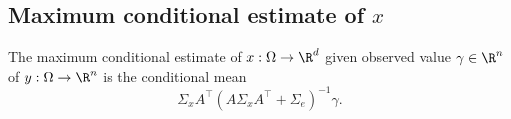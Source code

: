 \subsection*{Maximum conditional estimate of $x$}

\begin{proposition}
The maximum conditional estimate of $x: \Omega  \to \R ^d$ given observed value $\gamma  \in \R ^n$ of $y: \Omega  \to \R ^n$ is the conditional mean
  \[
\Sigma _{x} A^\top (A\Sigma _{x}A^\top  + \Sigma _{e})^{-1}\gamma .
  \]\end{proposition}